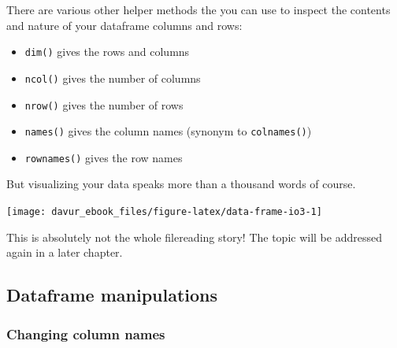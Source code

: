 \documentclass[]{book}
\newenvironment{Shaded}{\begin{snugshade}}{\end{snugshade}}
\newcommand{\DataTypeTok}[1]{\textcolor[rgb]{0.13,0.29,0.53}{#1}}
\newcommand{\KeywordTok}[1]{\textcolor[rgb]{0.13,0.29,0.53}{\textbf{#1}}}
\newcommand{\NormalTok}[1]{#1}
\newcommand{\OperatorTok}[1]{\textcolor[rgb]{0.81,0.36,0.00}{\textbf{#1}}}
\newcommand{\StringTok}[1]{\textcolor[rgb]{0.31,0.60,0.02}{#1}}
\providecommand{\tightlist}{%
  \setlength{\itemsep}{0pt}\setlength{\parskip}{0pt}}
\begin{document}
There are various other helper methods the you can use to inspect the contents and nature of your dataframe columns and rows:

\begin{itemize}
\tightlist
\item
  \texttt{dim()} gives the rows and columns
\item
  \texttt{ncol()} gives the number of columns
\item
  \texttt{nrow()} gives the number of rows
\item
  \texttt{names()} gives the column names (synonym to \texttt{colnames()})
\item
  \texttt{rownames()} gives the row names
\end{itemize}

But visualizing your data speaks more than a thousand words of course.

\begin{Shaded}
\end{Shaded}

\begin{center}\texttt{[image: davur\_ebook\_files/figure-latex/data-frame-io3-1]} \end{center}

This is absolutely not the whole filereading story! The topic will be addressed again in a later chapter.

\hypertarget{dataframe-manipulations}{%
\subsection{Dataframe manipulations}\label{dataframe-manipulations}}

\hypertarget{changing-column-names}{%
\subsubsection*{Changing column names}\label{changing-column-names}}
\end{document}
